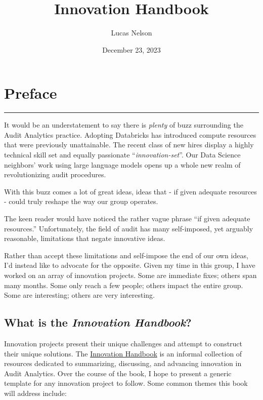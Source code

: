 \documentclass[
]{book}
\title{Innovation Handbook}
\author{Lucas Nelson}
\date{December 23, 2023}
\theoremstyle{definition}
\theoremstyle{definition}
\theoremstyle{definition}
\theoremstyle{definition}
\theoremstyle{remark}
\begin{document}
\maketitle

{
\setcounter{tocdepth}{1}
\tableofcontents
}
\hypertarget{preface}{%
\chapter*{Preface}\label{preface}}

\begin{center}\rule{0.5\linewidth}{0.5pt}\end{center}

It would be an understatement to say there is \emph{plenty} of buzz surrounding the
Audit Analytics practice. Adopting Databricks has introduced compute resources
that were previously unattainable. The recent class of new hires display a
highly technical skill set and equally passionate ``\emph{innovation-set}''. Our Data
Science neighbors' work using large language models opens up a whole new realm
of revolutionizing audit procedures.

With this buzz comes a lot of great ideas, ideas that - if given adequate
resources - could truly reshape the way our group operates.

The keen reader would have noticed the rather vague phrase ``if given adequate
resources.'' Unfortunately, the field of audit has many self-imposed, yet
arguably reasonable, limitations that negate innovative ideas.

Rather than accept these limitations and self-impose the end of our own ideas,
I'd instead like to advocate for the opposite. Given my time in this group, I
have worked on an array of innovation projects. Some are immediate fixes; others
span many months. Some only reach a few people; others impact the entire
group. Some are interesting; others are very interesting.

\hypertarget{innovation-handbook}{%
\section*{\texorpdfstring{What is the \emph{Innovation Handbook}?}{What is the Innovation Handbook?}}\label{innovation-handbook}}

Innovation projects present their unique challenges and attempt to construct
their unique solutions. The \protect\hyperlink{innovation-handbook}{Innovation Handbook} is an
informal collection of resources dedicated to summarizing, discussing, and
advancing innovation in Audit Analytics. Over the course of the book, I hope to
present a generic template for any innovation project to follow. Some common
themes this book will address include:
\end{document}
